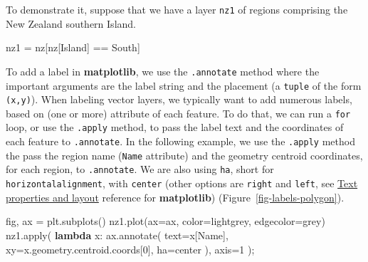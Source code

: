 \documentclass[
  letterpaper,
]{krantz}
\newenvironment{Shaded}{\begin{snugshade}}{\end{snugshade}}
\newcommand{\BuiltInTok}[1]{\textcolor[rgb]{0.00,0.23,0.31}{#1}}
\newcommand{\DecValTok}[1]{\textcolor[rgb]{0.68,0.00,0.00}{#1}}
\newcommand{\KeywordTok}[1]{\textcolor[rgb]{0.00,0.23,0.31}{\textbf{#1}}}
\newcommand{\NormalTok}[1]{\textcolor[rgb]{0.00,0.23,0.31}{#1}}
\newcommand{\OperatorTok}[1]{\textcolor[rgb]{0.37,0.37,0.37}{#1}}
\newcommand{\StringTok}[1]{\textcolor[rgb]{0.13,0.47,0.30}{#1}}
\begin{document}
To demonstrate it, suppose that we have a layer \texttt{nz1} of regions
comprising the New Zealand southern Island.

\begin{Shaded}
\begin{Highlighting}[]
\NormalTok{nz1 }\OperatorTok{=}\NormalTok{ nz[nz[}\StringTok{\textquotesingle{}Island\textquotesingle{}}\NormalTok{] }\OperatorTok{==} \StringTok{\textquotesingle{}South\textquotesingle{}}\NormalTok{]}
\end{Highlighting}
\end{Shaded}

To add a label in \textbf{matplotlib}, we use the \texttt{.annotate}
method where the important arguments are the label string and the
placement (a \texttt{tuple} of the form \texttt{(x,y)}). When labeling
vector layers, we typically want to add numerous labels, based on (one
or more) attribute of each feature. To do that, we can run a
\texttt{for} loop, or use the \texttt{.apply} method, to pass the label
text and the coordinates of each feature to \texttt{.annotate}. In the
following example, we use the \texttt{.apply} method the pass the region
name (\texttt{\textquotesingle{}Name\textquotesingle{}} attribute) and
the geometry centroid coordinates, for each region, to
\texttt{.annotate}. We are also using \texttt{ha}, short for
\texttt{horizontalalignment}, with
\texttt{\textquotesingle{}center\textquotesingle{}} (other options are
\texttt{\textquotesingle{}right\textquotesingle{}} and
\texttt{\textquotesingle{}left\textquotesingle{}}, see
\href{https://matplotlib.org/stable/users/explain/text/text_props.html}{Text
properties and layout} reference for \textbf{matplotlib})
(Figure~\ref{fig-labels-polygon}).

\begin{Shaded}
\begin{Highlighting}[]
\NormalTok{fig, ax }\OperatorTok{=}\NormalTok{ plt.subplots()}
\NormalTok{nz1.plot(ax}\OperatorTok{=}\NormalTok{ax, color}\OperatorTok{=}\StringTok{\textquotesingle{}lightgrey\textquotesingle{}}\NormalTok{, edgecolor}\OperatorTok{=}\StringTok{\textquotesingle{}grey\textquotesingle{}}\NormalTok{)}
\NormalTok{nz1.}\BuiltInTok{apply}\NormalTok{(}
    \KeywordTok{lambda}\NormalTok{ x: ax.annotate(}
\NormalTok{        text}\OperatorTok{=}\NormalTok{x[}\StringTok{\textquotesingle{}Name\textquotesingle{}}\NormalTok{], }
\NormalTok{        xy}\OperatorTok{=}\NormalTok{x.geometry.centroid.coords[}\DecValTok{0}\NormalTok{], }
\NormalTok{        ha}\OperatorTok{=}\StringTok{\textquotesingle{}center\textquotesingle{}}
\NormalTok{    ), }
\NormalTok{    axis}\OperatorTok{=}\DecValTok{1}
\NormalTok{)}\OperatorTok{;}
\end{Highlighting}
\end{Shaded}
\end{document}
